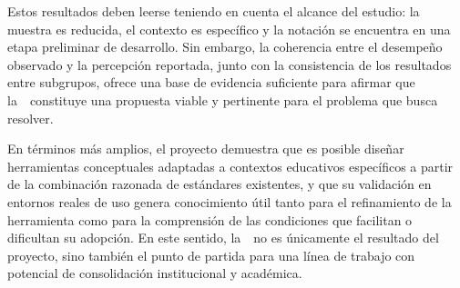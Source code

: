 Estos resultados deben leerse teniendo en cuenta el alcance del estudio: la muestra es reducida, el contexto es específico y la notación se encuentra en una etapa preliminar de desarrollo. Sin embargo, la coherencia entre el desempeño observado y la percepción reportada, junto con la consistencia de los resultados entre subgrupos, ofrece una base de evidencia suficiente para afirmar que la~\NDITI~constituye una propuesta viable y pertinente para el problema que busca resolver.

En términos más amplios, el proyecto demuestra que es posible diseñar herramientas conceptuales adaptadas a contextos educativos específicos a partir de la combinación razonada de estándares existentes, y que su validación en entornos reales de uso genera conocimiento útil tanto para el refinamiento de la herramienta como para la comprensión de las condiciones que facilitan o dificultan su adopción. En este sentido, la~\NDITI~no es únicamente el resultado del proyecto, sino también el punto de partida para una línea de trabajo con potencial de consolidación institucional y académica.